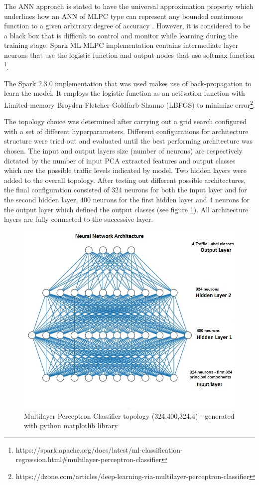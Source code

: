 \documentclass[12pt, a4paper]{report}
\theoremstyle{definition}
\theoremstyle{definition}%
\theoremstyle{definition}%
\theoremstyle{definition}%
\theoremstyle{definition}%
\theoremstyle{definition}%
\begin{document}
The ANN approach is stated to have the universal approximation property which underlines how an ANN of MLPC type can represent any bounded continuous function to a given arbitrary degree of accuracy \cite{hornik1990universal}. However, it is considered to be a black box that is difficult to control and monitor while learning during the training stage. Spark ML MLPC implementation contains intermediate layer neurons that use the logistic function and output nodes that use softmax function \footnote{https://spark.apache.org/docs/latest/ml-classification-regression.html\#multilayer-perceptron-classifier}.

The Spark 2.3.0 implementation that was used makes use of back-propagation to learn the model. It employs the logistic function as an activation function with Limited-memory Broyden-Fletcher-Goldfarb-Shanno (LBFGS) to minimize error\footnote{https://dzone.com/articles/deep-learning-via-multilayer-perceptron-classifier}.  


The topology choice was determined after carrying out a grid search configured with a set of different hyperparameters. Different configurations for architecture structure were tried out and evaluated until the best performing architecture was chosen. The input and output layers size (number of neurons) are respectively dictated by the number of input PCA extracted features and output classes which are the possible traffic levels indicated by model. Two hidden layers were added to the overall topology. After testing out different possible architectures, the final configuration consisted of 324 neurons for both the input layer and for the second hidden layer, 400 neurons for the first hidden layer and 4 neurons for the output layer which defined the output classes (see figure \ref{fig:ann_topology}). All architecture layers are fully connected to the successive layer. 


\begin{figure}[!]	
	\includegraphics[scale=0.70]{ann_topology.jpg}
	\centering
	\caption[Multilayer Perceptron Classifier topology]{Multilayer Perceptron Classifier topology (324,400,324,4) - generated with python matplotlib library }
	\label{fig:ann_topology}
\end{figure}
 
\end{document}
